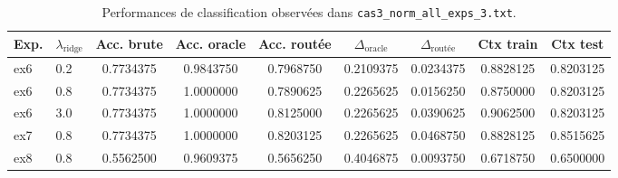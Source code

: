 \begin{table}[ht]
\centering
\small
\begin{tabular}{llccccccc}
\hline
Exp.
&
$\lambda_{\mathrm{ridge}}$
&
Acc. brute
&
Acc. oracle
&
Acc. routée
&
$\Delta_{\mathrm{oracle}}$
&
$\Delta_{\mathrm{routée}}$
&
Ctx train
&
Ctx test
\\
\hline

ex6
&
0.2
&
0.7734375
&
0.9843750
&
0.7968750
&
0.2109375
&
0.0234375
&
0.8828125
&
0.8203125
\\

ex6
&
0.8
&
0.7734375
&
1.0000000
&
0.7890625
&
0.2265625
&
0.0156250
&
0.8750000
&
0.8203125
\\

ex6
&
3.0
&
0.7734375
&
1.0000000
&
0.8125000
&
0.2265625
&
0.0390625
&
0.9062500
&
0.8203125
\\

ex7
&
0.8
&
0.7734375
&
1.0000000
&
0.8203125
&
0.2265625
&
0.0468750
&
0.8828125
&
0.8515625
\\

ex8
&
0.8
&
0.5562500
&
0.9609375
&
0.5656250
&
0.4046875
&
0.0093750
&
0.6718750
&
0.6500000
\\

\hline
\end{tabular}
\caption{Performances de classification observées dans
\texttt{cas3\_norm\_all\_exps\_3.txt}.}
\end{table}




